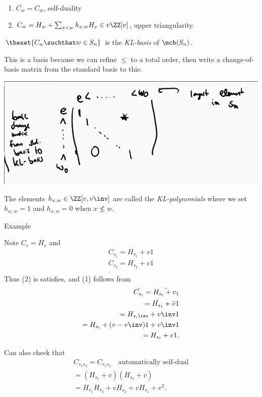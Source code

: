 \begin{enumerate}
\def\labelenumi{\arabic{enumi}.}
\tightlist
\item
  \(\bar{C_w} = C_w\), self-duality
\item
  \(C_w = H_w + \sum_{x < w} h_{x, w} H_x \in v\ZZ[v]\), upper
  triangularity.
\end{enumerate}

\begin{description}
\tightlist
\item[Definition]
\(\theset{C_w \suchthat w\in S_n}\) is the \emph{KL-basis} of
\(\mch(S_n)\).
\end{description}

This is a basis because we can refine \(\leq\) to a total order, then
write a change-of-basis matrix from the standard basis to this:

\includegraphics{figures/image_2020-07-13-11-59-25.png}

The elements \(h_{x, w} \in \ZZ[v, v\inv]\) are called the
\emph{KL-polynomials} where we set \(h_{w, w} = 1\) and \(h_{x, w} = 0\)
when \(x\not\leq w\).

Example

Note \(C_e = H_e\) and \begin{align*}
C_{s_1} = H_{s_1} + v1 \\
C_{s_2} = H_{s_2} + v1 \\
.\end{align*} Thus (2) is satisfies, and (1) follows from \begin{align*}
\bar{C_{s_i}} 
= \bar{H_{s_i} + v_1} \\
= \bar{H_{s_1}} + \bar{v} 1 \\
= H_{s_i\inv} + v\inv 1 \\
= H_{s_i} + (v-v\inv)1 + v\inv 1 \\
= H_{s_i} + v1
.\end{align*}

Can also check that \begin{align*}
C_{s_1 s_2} = C_{s_1 s_2} \quad\text{automatically self-dual} \\
= (H_{s_1} + v) (H_{s_2} + v) \\
= H_{s_1} H_{s_2} + v H_{s_2} + vH_{s_1} + v^2
.\end{align*}

